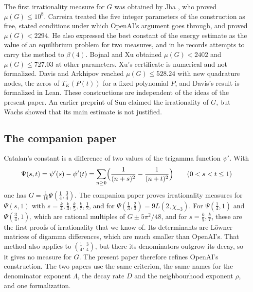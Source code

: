 \documentclass[11pt]{amsart}
\theoremstyle{definition}
\theoremstyle{remark}
\numberwithin{equation}{section}
\begin{document}
The first irrationality measure for $G$ was obtained by Jha \cite{Jha2026}, who proved $\mu(G)\le10^8$.
Carreira \cite{Carreira2026} treated the five integer parameters of the construction as free, stated
conditions under which OpenAI's argument goes through, and proved $\mu(G)<2294$. He also expressed the best
constant of the energy estimate as the value of an equilibrium problem for two measures, and in
\cite{Carreira2026b} he records attempts to carry the method to $\beta(4)$. Bojnal \cite{Bojnal2026} and Xu
\cite{Xu2026} obtained $\mu(G)<2402$ and $\mu(G)\le727.03$ at other parameters. Xu's certificate is
numerical and not formalized. Davis \cite{Davis2026} and Arkhipov \cite{Arkhipov2026} reached
$\mu(G)\le528.24$ with new quadrature nodes, the zeros of $T_K(P(t))$ for a fixed polynomial $P$, and
Davis's result is formalized in Lean. These constructions are independent of the ideas of the present
paper. An earlier preprint of Sun \cite{Sun2026} claimed the irrationality of $G$, but Wachs
\cite{Wachs2026} showed that its main estimate is not justified.

\subsection{The companion paper}
Catalan's constant is a difference of two values of the trigamma function $\psi'$. With
\[
 \Psi(s,t)=\psi'(s)-\psi'(t)=\sum_{n\ge0}\Bigl(\frac1{(n+s)^2}-\frac1{(n+t)^2}\Bigr)\qquad(0<s<t\le1)
\]
one has $G=\frac1{16}\Psi(\frac14,\frac34)$. The companion paper \cite{Litsey2026b} proves irrationality
measures for $\Psi(s,1)$ with $s=\frac k4,\frac k3,\frac k5,\frac k7,\frac12$, and for
$\Psi(\frac13,\frac23)=9L(2,\chi_{-3})$. For $\Psi(\frac14,1)$ and $\Psi(\frac34,1)$, which are rational multiples
of $G\pm5\pi^2/48$, and for $s=\frac k5,\frac k7$, these are the first proofs of irrationality that we know of. Its determinants are L\"owner matrices of digamma differences,
which are much smaller than OpenAI's. That method also applies to $(\frac14,\frac34)$, but there its
denominators outgrow its decay, so it gives no measure for $G$. The present paper therefore refines
OpenAI's construction. The two papers use the same criterion, the same names for the denominator exponent
$\Lambda$, the decay rate $D$ and the neighbourhood exponent $\rho$, and one formalization.
\end{document}
